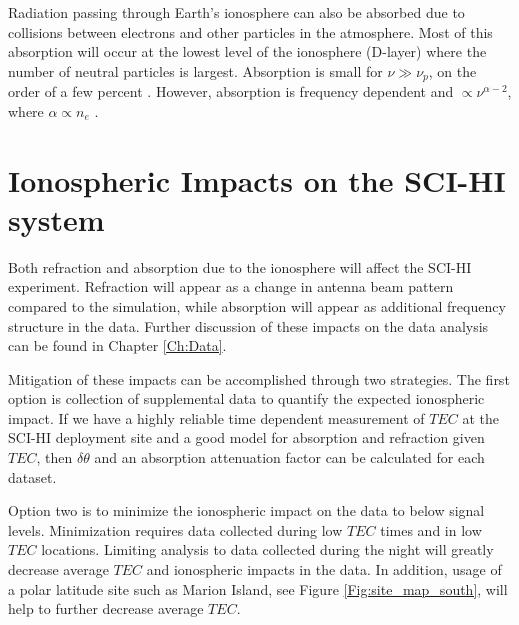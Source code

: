 Radiation passing through Earth's ionosphere can also be absorbed due to collisions between electrons and other particles in the atmosphere. Most of this absorption will occur at the lowest level of the ionosphere (D-layer) where the number of neutral particles is largest. Absorption is small for $\nu \gg \nu_p$, on the order of a few percent \cite{vedantham_2014}. However, absorption is frequency dependent and $\propto \nu^{\alpha -2}$, where $\alpha \propto n_e$ \cite{thompson_2001}. 



\section{Ionospheric Impacts on the SCI-HI system}

Both refraction and absorption due to the ionosphere will affect the SCI-HI experiment. Refraction will appear as a change in antenna beam pattern compared to the simulation, while absorption will appear as additional frequency structure in the data. Further discussion of these impacts on the data analysis can be found in Chapter \ref{Ch:Data}. 

Mitigation of these impacts can be accomplished through two strategies. The first option is collection of supplemental data to quantify the expected ionospheric impact. If we have a highly reliable time dependent measurement of $TEC$ at the SCI-HI deployment site and a good model for absorption and refraction given $TEC$, then $\delta \theta$ and an absorption attenuation factor can be calculated for each dataset. 

Option two is to minimize the ionospheric impact on the data to below \cm signal levels. Minimization requires data collected during low $TEC$ times and in low $TEC$ locations. Limiting analysis to data collected during the night will greatly decrease average $TEC$ and ionospheric impacts in the data. In addition, usage of a polar latitude site such as Marion Island, see Figure \ref{Fig:site_map_south}, will help to further decrease average $TEC$.